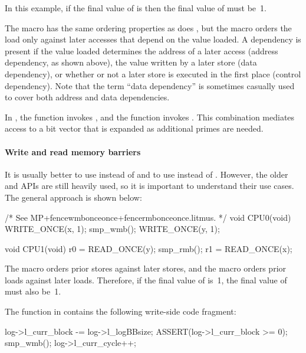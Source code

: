 In this example, if the final value of  is  then the final
value of  must be~1.

The  macro has the same ordering properties as does
, but the  macro orders the
load only against later accesses that depend on the value loaded.
A dependency is present if the value loaded determines the address of
a later access (address dependency, as shown above), the value written
by a later store (data dependency), or whether or not a later store is
executed in the first place (control dependency).
Note that the term ``data dependency'' is sometimes casually used to
cover both address and data dependencies.

In , the 
function invokes , and the 
function invokes .
This combination mediates access to a bit vector that is expanded as
additional primes are needed.


\paragraph{Write and read memory barriers}

It is usually better to use  instead of 
and to use  instead of .
However, the older  and  APIs are still heavily
used, so it is important to understand their use cases.
The general approach is shown below:

\begin{VerbatimU}
	/* See MP+fencewmbonceonce+fencermbonceonce.litmus. */
	void CPU0(void)
	{
		WRITE_ONCE(x, 1);
		smp_wmb();
		WRITE_ONCE(y, 1);
	}

	void CPU1(void)
	{
		r0 = READ_ONCE(y);
		smp_rmb();
		r1 = READ_ONCE(x);
	}
\end{VerbatimU}

The  macro orders prior stores against later stores, and the
 macro orders prior loads against later loads.
Therefore, if the final value of  is~1, the final value of 
must also be~1.

The  function in 
contains the following write-side code fragment:

\begin{VerbatimU}
	log->l_curr_block -= log->l_logBBsize;
	ASSERT(log->l_curr_block >= 0);
	smp_wmb();
	log->l_curr_cycle++;
\end{VerbatimU}

